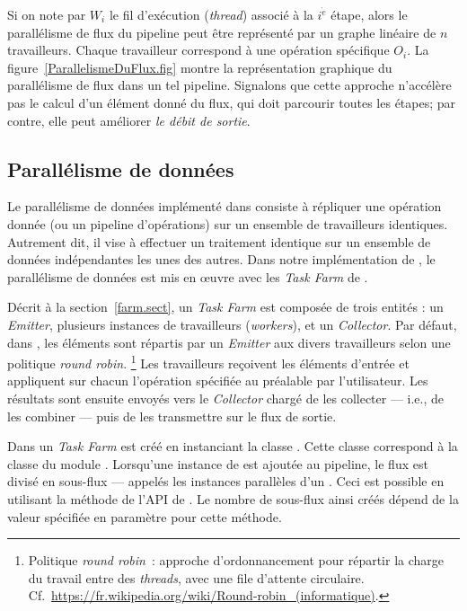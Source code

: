 Si on note par $W_i$ le fil d'ex\'ecution (\emph{thread}) associ\'e à la $i^{\grave e}$ {étape}, alors
le parall\'elisme de flux du pipeline peut \^etre repr\'esent\'e par un graphe lin\'eaire de $n$ travailleurs. Chaque travailleur correspond \`a une op\'eration sp\'ecifique $O_i$. La figure~\ref{ParallelismeDuFlux.fig} montre la repr\'esentation graphique du parall\'elisme de flux dans un tel pipeline. Signalons que cette approche n'acc\'el\`ere pas le calcul d'un \'el\'ement donné du flux, qui doit parcourir toutes les étapes; par contre, elle peut am\'eliorer \emph{le d\'ebit de sortie}.

\subsection{Parall\'elisme de donn\'ees}
\label{ParallelismeDeDonnees.sect}

Le parall\'elisme de donn\'ees impl\'ement\'e dans   consiste \`a r\'epliquer une op\'eration donnée (ou un pipeline d'opérations) sur un ensemble de travailleurs identiques. Autrement dit, il vise \`a effectuer un traitement identique sur un ensemble de donn\'ees ind\'ependantes les unes des autres. 
%
Dans notre impl\'ementation de \PpFf, le parall\'elisme de donn\'ees est mis en \oe{}uvre avec les \emph{Task Farm} de .


D\'ecrit \`a la section~\ref{farm.sect}, un \emph{Task Farm} est compos\'ee de trois entit\'es : un \emph{Emitter}, plusieurs instances de travailleurs (\emph{workers}), et un \emph{Collector}. Par d\'efaut, dans \PpFf{}, les \'el\'ements sont r\'epartis par un \emph{Emitter} aux divers travailleurs selon une politique \emph{round robin}.%
%
\footnote{Politique \emph{round robin}~: approche d'ordonnancement pour r\'epartir la charge du travail entre des \emph{threads}, avec une file d'attente circulaire. Cf.~\url{https://fr.wikipedia.org/wiki/Round-robin_(informatique)}.} 
%
Les travailleurs re\c{c}oivent les \'el\'ements d'entr\'ee et appliquent sur chacun l'op\'eration sp\'ecifi\'ee au pr\'ealable par l'utilisateur. Les r\'esultats sont ensuite envoy\'es vers le \emph{Collector} charg\'e de les collecter --- i.e., de les combiner --- puis de les transmettre sur le flux de sortie.

Dans  un \emph{Task Farm} est cr\'e\'e en instanciant la classe . Cette classe correspond \`a la classe  du module . Lorsqu'une instance de  est ajout\'ee au {pipeline}, le flux est divis\'e en sous-flux --- appel\'es les instances parall\`eles d'un . Ceci est possible en utilisant la m\'ethode  de l'API de . Le nombre de sous-flux ainsi cr\'e\'es d\'epend de la valeur sp\'ecifi\'ee en param\`etre pour cette m\'ethode.  

